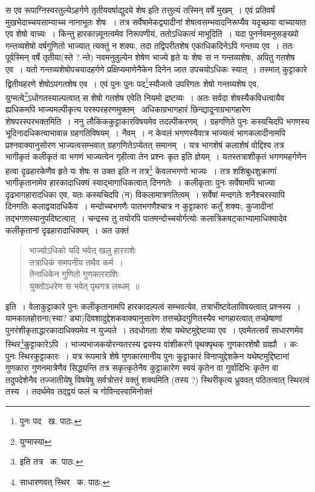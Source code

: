 \documentclass[11pt, openany]{book}
\begin{document}
\noindent स एव रूपाग्निस्वरतुल्येऽहर्गणे तृतीयवर्षाद्युदये शेष इति तत्तुल्यं तस्मिन् वर्षे मुखम्~। एवं प्रतिवर्षं मुखभेदाच्चयसाम्याच्च नानाभूतः शेषः~। तत्र सर्वेषामेकद्व्यादीनां शेषत्वसम्भवादनिरूप्यैव यदृच्छया वाच्यायात एव शेषो वाच्यः~। किन्तु हारकान्न्यूनत्वमेव निरूपणीयं, ततोऽधिकत्वं माभूदिति~। यदा पुनर्नवमनुसङ्ख्यो गन्तव्यशेषो वर्षगुणितो भाज्यात् त्यक्तुं न शक्यः, तदा तद्विपरीतशेष एकाधिकदिनेऽपि गन्तव्य एव~। ततः पूर्वस्मिन् वर्षे तृतीया(स्ते ? न्ते) नवमनुतुल्येन शेषेण भाज्ये हृते यः शेषः स न गन्तव्यशेषः, अपितु गतशेष एव~। यतो गन्तव्यशेषोपचयादहर्गणे प्रक्षिप्यमाणेनैकेन दिनेन जात उपचयोऽधिकः स्यात्~। तस्मात् कुट्टाकारे द्वितीयहरणे शेषोऽपगतशेष एव~। एवं पुनः पुनः पद\renewcommand{\thefootnote}{१}\footnote{पुनः पद \textendash\ ख. पाठः.}स्यौजत्वे उपरिगतः शेषो गन्तव्यशेष एव, युग्मत्वे\renewcommand{\thefootnote}{२}\footnote{युग्मास्या}ऽधोगतस्याल्पत्वात् स शेषो गतशेष एवेति नियमो द्रष्टव्यः~। अतः सर्वदा शेषस्यैकविधत्वायैव ह्यधिकमपि भाज्यमल्पीकृत्य परस्परहरणमुक्तम् \textendash\ {\qt अधिकाग्रभागहारं छिन्द्यादूनाग्रभागहारेण शेषपरस्परभक्तमि}ति~। ननु लौकिककुट्टाकारविषयमेव तदल्पीकरणम्~। ग्रहगणिते पुनः कस्यचिदपि भगणस्य भूदिनादधिकत्वाभावान्न ग्रहगतिविषयम्~। नैवम्~। न केवलं भगणस्यैवात्र भाज्यत्वं भागकलादीनामपि प्रश्नवाक्यानुसोरण भाज्यत्वसम्भवात् ग्रहगणितेऽप्येतत् समानम्~। यत्र भागशेषं कलाशेषं वोद्दिश्य तत्र भागीकृतं कलीकृतं वा भगणं भाज्यत्वेन गृहीत्वा तेन प्रश्नः कृत इति ज्ञेयम्~। यतस्तत्राशीकृतं भगणमहर्गणेन हत्वा दृढहारकेणैव हृते यः शेषः स उक्त इति न तत्र\renewcommand{\thefootnote}{३}\footnote{इति तत्र \textendash\ क. पाठः.} केवलभगणो भाज्यः~। तत्र शशिबुधशुक्राणां भागीकृतानामेव हारकादाधिक्यं स्याद्भागाधिकत्वात् दिनगतेः~। कलीकृताः पुनः सर्वेषामपि भाज्या दृढभागहारादधिका एव, यतः कस्यचिदपि (न) विकलामात्रगतित्वम्~। सर्वेषां मन्दगतेः शनैश्चरस्यापि दिनगतिः कलाद्वयादधिकैव~। मन्दोच्चभगणैः पातभगणैश्चात्र न कुट्टाकारः कर्तुं शक्यः, कुजादीनां तद्भगणस्यानुपदिष्टत्वात्~। चन्द्रस्य तु तयोरपि पातमन्दोच्चयोर्गत्योः कलात्रिकषट्काभ्यामाधिक्यादेव कलीकृतानां दृढहारादाधिक्यम्~। अत उक्तं\textendash

\newpage

\begin{quote}
{\qt भाज्योऽधिको यदि भवेत् खलु हारराशेः\\
तत्राधिकं समपनीय तथैव कर्म~।\\
तेनाधिकेन गुणितो गुणकारराशिः\\
युक्तोऽधरेण स भवेत् पृथगत्र लब्धम्~॥}
\end{quote}

\noindent इति~। वेलाकुट्टाकारे पुनः कलीकृतानामपि हारकादल्पत्वं सम्भवत्येव, तत्राभीष्टवेलाविषयत्वात् प्रश्नस्य~। यामकालहोराना(स्या? ड्या)दिवशादुद्देशकवाक्यानुसारेण तत्तच्छेदगुणितस्यैव भागहारत्वात् तच्छेषाणां पुनरंशीकृताद्धारकादाधिक्यमेव न युज्यते~। तदधोगताः शेषा यथेष्टमुद्देष्टव्या एव~। एवमेतत्सर्वं साधारणमेव स्थिर\renewcommand{\thefootnote}{१}\footnote{साधारणवत् स्थिर \textendash\ क. पाठः.}कुट्टाकारेऽपि~। भाज्यभाजकयोरन्यतरस्य द्वयस्य वांशीकरणे पृथक्पृथक् गुणकारशेषौ ग्राह्यौ~। कः पुनः स्थिरकुट्टाकारः~। यत्र रूपमात्रे शेषे गुणकारमानीय पुनः कुट्टाकारं विनाप्युद्देशकेन यथेष्टमुद्दिष्टानां गुणकारा गुणनमात्रेणैव सिद्ध्यन्ति तत्र सकृत्कृतेनैव कुट्टाकारेण स्वयं कृतेन वा गुर्वादिभिः कृतेन वा तदुपदेशेनैव तज्जातीयेषु विषयेषु सर्वत्रोत्तरं वक्तुं शक्यमिति (तस्य ?) स्थिरीकृत्य ध्रुववत् पठितत्वात् स्थिरत्वं तस्य~। तदर्थमेव तद्द्वयं फलं च गोविन्दस्वामिनोक्तं\textendash
\end{document}
